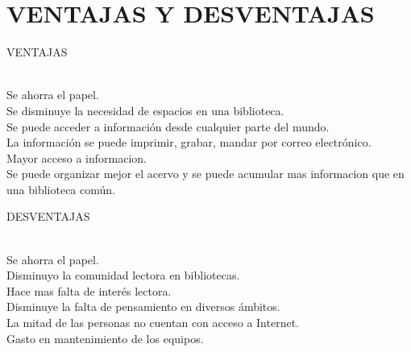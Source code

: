 \section{VENTAJAS Y DESVENTAJAS} 

\begin{enumerate}[7.]

	\begin{center}
	\item VENTAJAS
	\end{center}
  \\ Se ahorra el papel. 
  \\ Se disminuye la  necesidad de espacios en una biblioteca.  
  \\ Se puede acceder a información desde cualquier parte del mundo.  
  \\ La información se puede imprimir, grabar, mandar por correo electrónico. 
  \\ Mayor acceso a informacion. 
  \\ Se puede organizar mejor el acervo  y se puede acumular mas  informacion que en una biblioteca común.
  \\
	\begin{center}
	\item DESVENTAJAS
	\end{center}
	\\ Se ahorra el papel. 
  \\ Disminuyo la comunidad lectora en bibliotecas. 
  \\ Hace mas falta de interés lectora. 
  \\ Disminuye la falta de pensamiento en diversos ámbitos.  
  \\ La mitad de las personas no cuentan con acceso a Internet. 
  \\ Gasto en mantenimiento de los equipos. 
	\\
    


\end{enumerate} 

